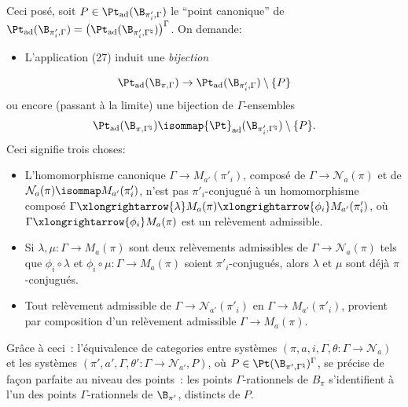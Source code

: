 Ceci posé, soit $P\in{\Pt}_{\operatorname{ad}}(\B_{\pi'_i,\Gamma})$ le ``point canonique'' de ${\Pt}_{\operatorname{ad}}(\B_{\pi'_i,\Gamma}) = \bigl({\Pt}_{\operatorname{ad}}(\B_{\pi'_i,\Gamma^\natural})\bigr)^\Gamma$. On demande:
\begin{itemize}
	\item[(5)] L'application (27) induit une \emph{bijection} 
\end{itemize}
$$
{\Pt}_{\operatorname{ad}}(\B_{\pi,\Gamma})\to{\Pt}_{\operatorname{ad}}(\B_{\pi'_i,\Gamma})\setminus\{P\}
$$
ou encore (passant à la limite) une bijection de $\Gamma$-ensembles
$$
{\Pt}_{\operatorname{ad}}(\B_{\pi,\Gamma^\natural})
\isommap{\Pt}_{\operatorname{ad}} (\B_{\pi'_i,\Gamma^\natural})\setminus\{P\}.
$$
Ceci signifie trois choses:
\begin{itemize}
	\item[(a)] L'homomorphisme canonique $\Gamma\to M_{a'}(\pi'_i)$, composé de $\Gamma\to\mathcal{N}_a(\pi)$ et de $\mathcal{N}_a(\pi)\isommap M_{a'}(\pi'_i)$, n'est pas $\pi'_i$-conjugué à un homomorphisme composé $\Gamma\xlongrightarrow{\lambda} M_a(\pi)\xlongrightarrow{\phi_i} M_{a'}(\pi'_i)$, où $\Gamma\xlongrightarrow{\phi_i} M_a(\pi)$ est un relèvement admissible.
	\item[(b)] Si $\lambda,\mu:\Gamma\to M_a(\pi)$ sont deux relèvements admissibles de $\Gamma\to\mathcal{N}_a(\pi)$ tels que $\phi_i\circ\lambda$ et $\phi_i\circ\mu:\Gamma\to M_a(\pi)$ soient $\pi'_i$-conjugués, alors $\lambda$ et $\mu$ sont déjà $\pi$-conjugués.
	\item[(c)] Tout relèvement admissible de $\Gamma\to \mathcal{N}_{a'}(\pi'_i)$ en $\Gamma\to M_{a'}(\pi'_i)$, provient par composition d'un relèvement admissible $\Gamma\to M_a(\pi)$.
\end{itemize}
Grâce à ceci~: l'équivalence de categories entre systèmes $(\pi,a,i,\Gamma,\theta:\Gamma\to\mathcal{N}_a)$ et les systèmes $(\pi',a',\Gamma,\theta':\Gamma\to\mathcal{N}_{a'},P)$, où $P\in{\Pt}(\B_{\pi',\Gamma^\natural})^\Gamma$, se précise de fa\c{c}on parfaite au niveau des points~: les points $\Gamma$-rationnels de $B_{\pi}$ s'identifient à l'un des points $\Gamma$-rationnels de $\B_{\pi'}$, distincts de $P$.

